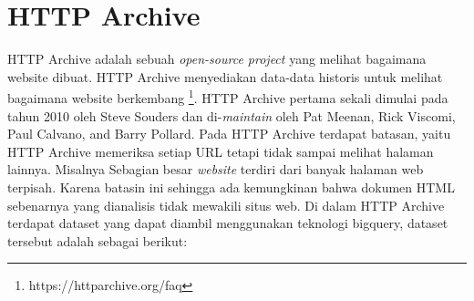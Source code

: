\section{HTTP Archive}
HTTP Archive adalah sebuah \textit{open-source project} yang melihat bagaimana website dibuat. HTTP Archive menyediakan data-data historis untuk melihat bagaimana website berkembang \footnote{https://httparchive.org/faq}. HTTP Archive pertama sekali dimulai pada tahun 2010 oleh Steve Souders dan di-\textit{maintain} oleh Pat Meenan, Rick Viscomi, Paul Calvano, and Barry Pollard. Pada HTTP Archive terdapat batasan, yaitu HTTP Archive memeriksa setiap URL tetapi tidak sampai melihat halaman lainnya. Misalnya Sebagian besar \textit{website} terdiri dari banyak halaman web terpisah. Karena batasin ini sehingga ada kemungkinan bahwa dokumen HTML sebenarnya yang dianalisis tidak mewakili situs web. Di dalam HTTP Archive terdapat dataset yang dapat diambil menggunakan teknologi bigquery, dataset tersebut adalah sebagai berikut:
